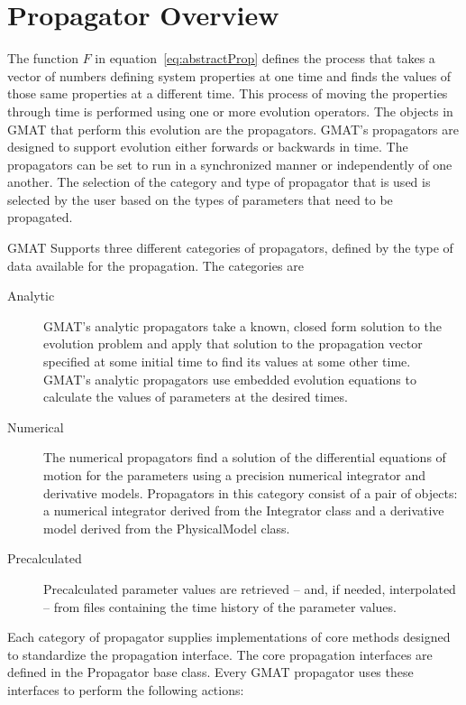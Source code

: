 \section{Propagator Overview}

The function $F$ in equation~\ref{eq:abstractProp} defines the process that takes a vector of
numbers defining system properties at one time and finds the values of those same properties at a
different time.  This process of moving the properties through time is performed using one
or more evolution operators.  The objects in GMAT that perform this evolution are the propagators.
GMAT's propagators are designed to support evolution either forwards or backwards in time.  The
propagators can be set to run in a synchronized manner or independently of one another.  The
selection of the category and type of propagator that is used is selected by the user based on the
types of parameters that need to be propagated.

GMAT Supports three different categories of propagators, defined by the type of data available for
the propagation.  The categories are

\begin{description}
\item[Analytic] GMAT's analytic propagators take a known, closed form solution to the evolution
problem and apply that solution to the propagation vector specified at some initial time to find its
values at some other time.  GMAT's analytic propagators use embedded evolution equations to
calculate the values of parameters at the desired times.
\item[Numerical] The numerical propagators find a solution of the differential equations of motion
for the parameters using a precision numerical integrator and derivative models.  Propagators in
this category consist of a pair of objects: a numerical integrator derived from the Integrator class
and a derivative model derived from the PhysicalModel class.
\item[Precalculated]  Precalculated parameter values are retrieved -- and, if needed, interpolated
-- from files containing the time history of the parameter values.
 \end{description}

Each category of propagator supplies implementations of core methods designed to standardize
the propagation interface.  The core propagation interfaces are defined in the Propagator base
class.  Every GMAT propagator uses these interfaces to perform the following actions:


